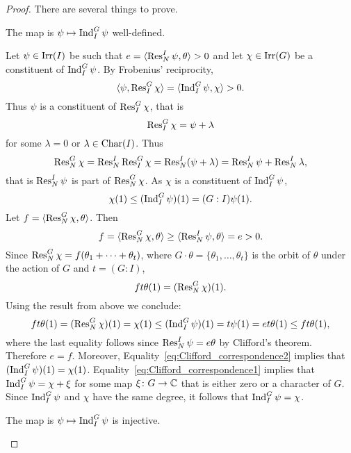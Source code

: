 \begin{proof}
    There are several things to prove. 

    \begin{claim}
        The map is $\psi\mapsto\operatorname{Ind}_I^G\psi$ well-defined. 
    \end{claim}

    Let $\psi\in\operatorname{Irr}(I)$ be such that $e=\langle\operatorname{Res}_N^I\psi,\theta\rangle>0$ and 
    let $\chi\in\operatorname{Irr}(G)$ be a constituent of $\operatorname{Ind}_I^G\psi$. By Frobenius' reciprocity, 
    \begin{equation}
        \label{eq:Clifford_correspondence1}
        \langle\psi,\operatorname{Res}_I^G\chi\rangle=\langle\operatorname{Ind}_I^G\psi,\chi\rangle>0.
    \end{equation}
    Thus $\psi$ is a constituent of $\operatorname{Res}_I^G\chi$, that is 
    \[
    \operatorname{Res}_I^G\chi=\psi+\lambda 
    \]
    for some $\lambda=0$ or $\lambda\in\operatorname{Char}(I)$. Thus
    \[
    \operatorname{Res}_N^G\chi=\operatorname{Res}_N^I\operatorname{Res}_I^G\chi=\operatorname{Res}_N^I(\psi+\lambda)
    =\operatorname{Res}_N^I\psi+\operatorname{Res}_N^I\lambda, 
    \]
    that is 
    $\operatorname{Res}_N^I\psi$ is part of $\operatorname{Res}_N^G\chi$. 
    As $\chi$ is a constituent of $\operatorname{Ind}_I^G \psi$, 
    \[
    \chi(1)\leq(\operatorname{Ind}_I^G\psi)(1)=(G:I)\psi(1).
    \]
    Let $f=\langle\operatorname{Res}_N^G\chi,\theta\rangle$. Then  
    \[
    f=\langle\operatorname{Res}_N^G\chi,\theta\rangle
    \geq\langle\operatorname{Res}_N^I\psi,\theta\rangle=e>0.
    \]
    Since $\operatorname{Res}_N^G\chi=f(\theta_1+\cdots+\theta_t)$, where $G\cdot\theta=\{\theta_1,\dots,\theta_t\}$ is 
    the orbit of $\theta$ under the action of $G$ and $t=(G:I)$,  
    \[ ft\theta(1)=(\operatorname{Res}_N^G\chi)(1). \]
    Using the result from above we conclude:
    \begin{equation}
    \label{eq:Clifford_correspondence2}
    ft\theta(1)=(\operatorname{Res}_N^G\chi)(1)=\chi(1)\leq(\operatorname{Ind}_I^G\psi)(1)=t\psi(1)=et\theta(1)\leq ft\theta(1),
    \end{equation}
    where the last equality follows since 
    $\operatorname{Res}_N^I\psi=e\theta$ by Clifford's theorem. Therefore $e=f$. Moreover, 
    Equality~\eqref{eq:Clifford_correspondence2}
    implies that 
    $(\operatorname{Ind}_I^G\psi)(1)=\chi(1)$. Equality~\eqref{eq:Clifford_correspondence1}
    implies that $\operatorname{Ind}_I^G\psi=\chi+\xi$ for some map $\xi\colon G\to\mathbb{C}$ that is 
    either zero or a character of $G$. Since 
    $\operatorname{Ind}_I^G\psi$ and $\chi$ have the same degree, 
    it follows that $\operatorname{Ind}_I^G\psi=\chi$. 

    \begin{claim}
        The map is $\psi\mapsto\operatorname{Ind}_I^G\psi$ is injective. 
    \end{claim}


\end{proof}
